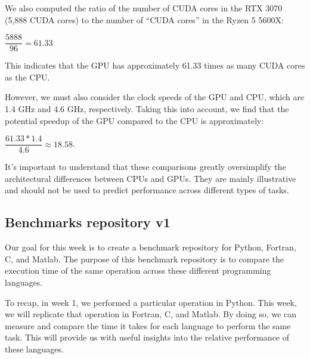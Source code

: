 We also computed the ratio of the number of CUDA cores in the RTX 3070 (5,888 CUDA cores) to the number of ``CUDA cores'' in the Ryzen 5 5600X:

\vspace{-0.5em}
\begin{center}
$\dfrac{{5888}}{{96}} = 61.33$
\end{center}

This indicates that the GPU has approximately 61.33 times as many CUDA cores as the CPU.

However, we must also consider the clock speeds of the GPU and CPU, which are 1.4 GHz and 4.6 GHz, respectively. Taking this into account, we find that the potential speedup of the GPU compared to the CPU is approximately:

\begin{center}
$\dfrac{{61.33 * 1.4}}{{4.6}} \approx 18.58$.
\end{center}

It's important to understand that these comparisons greatly oversimplify the architectural differences between CPUs and GPUs. They are mainly illustrative and should not be used to predict performance across different types of tasks.


\clearpage

\subsection{Benchmarks repository v1}

Our goal for this week is to create a benchmark repository for Python, Fortran, C, and Matlab. The purpose of this benchmark repository is to compare the execution time of the same operation across these different programming languages.

To recap, in week 1, we performed a particular operation in Python. This week, we will replicate that operation in Fortran, C, and Matlab. By doing so, we can measure and compare the time it takes for each language to perform the same task. This will provide us with useful insights into the relative performance of these languages.

\vspace{1em}


